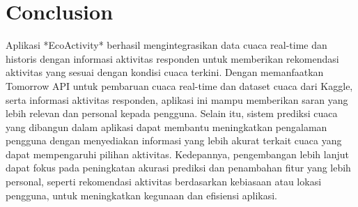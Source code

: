 \documentclass[journal,article,submit,pdftex,moreauthors]{Definitions/mdpi}
\begin{document}
\section{Conclusion}
Aplikasi *EcoActivity* berhasil mengintegrasikan data cuaca real-time dan historis dengan informasi aktivitas responden untuk memberikan rekomendasi aktivitas yang sesuai dengan kondisi cuaca terkini. Dengan memanfaatkan Tomorrow API untuk pembaruan cuaca real-time dan dataset cuaca dari Kaggle, serta informasi aktivitas responden, aplikasi ini mampu memberikan saran yang lebih relevan dan personal kepada pengguna. Selain itu, sistem prediksi cuaca yang dibangun dalam aplikasi dapat membantu meningkatkan pengalaman pengguna dengan menyediakan informasi yang lebih akurat terkait cuaca yang dapat mempengaruhi pilihan aktivitas. Kedepannya, pengembangan lebih lanjut dapat fokus pada peningkatan akurasi prediksi dan penambahan fitur yang lebih personal, seperti rekomendasi aktivitas berdasarkan kebiasaan atau lokasi pengguna, untuk meningkatkan kegunaan dan efisiensi aplikasi.
\end{document}

